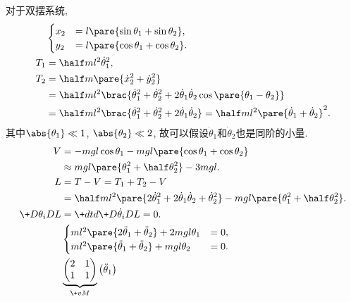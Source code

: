 \documentclass{ctexart}
\begin{document}
\begin{sample}
    \begin{ex}
        对于双摆系统,
        \begin{align*}
            &\begin{cases}
            x_2 &= l\pare{\sin\theta_1 + \sin\theta_2}, \\
            y_2 &= l\pare{\cos\theta_1 + \cos\theta_2}.
            \end{cases}\\
            T_1 &= \half ml^2\dot{\theta}_1^2, \\
            T_2 &= \half m\pare{\dot{x}_2^2 + \dot{y}_2^2} \\
            &= \half ml^2 \brac{\dot{\theta}_1^2 + \dot{\theta}_2^2 + 2\dot{\theta}_1\dot{\theta}_2\cos\pare{\theta_1 - \theta_2}} \\
            &= \half m l^2 \brac{\dot{\theta}_1^2 + \dot{\theta}_2^2 + 2\dot{\theta}_1\dot{\theta}_2} = \half ml^2\pare{\dot{\theta}_1 + \dot{\theta}_2}^2.
        \end{align*}
        其中$\abs{\theta_1} \ll 1$, $\abs{\theta_2}\ll 2$, 故可以假设$\dot{\theta}_1$和$\dot{\theta}_2$也是同阶的小量.
        \begin{align*}
            V &= -mgl\cos\theta_1 - mgl \pare{\cos\theta_1 + \cos\theta_2} \\
            &\approx mgl\pare{\theta_1^2 + \half \theta_2^2} - 3mgl. \\
            L &= T-V  = T_1 + T_2 - V \\
            &= \half ml^2\pare{2\dot{\theta}_1^2 + 2\dot{\theta}_1\dot{\theta}_2 + \dot{\theta}_2^2} - mgl\pare{\theta_1^2 + \half \theta_2^2}. \\
            \+D{\theta_i}DL &= \+dtd{} \+D{\dot{\theta}_i}DL = 0. \\
            &\begin{cases}
                ml^2 \pare{2\ddot{\theta}_1 + \ddot{\theta}_2} + 2mgl\theta_1 &= 0, \\
                ml^2 \pare{\ddot{\theta}_1 + \ddot{\theta}_2} + mgl\theta_2 &= 0.
            \end{cases} \\
            & \underbrace{\begin{pmatrix}
                2 & 1 \\
                1 & 1
            \end{pmatrix}}_{\+vM}\begin{pmatrix}
                \ddot{\theta}_1 \\

\end{pmatrix}
\end{align*}
\end{ex}
\end{sample}
\end{document}
